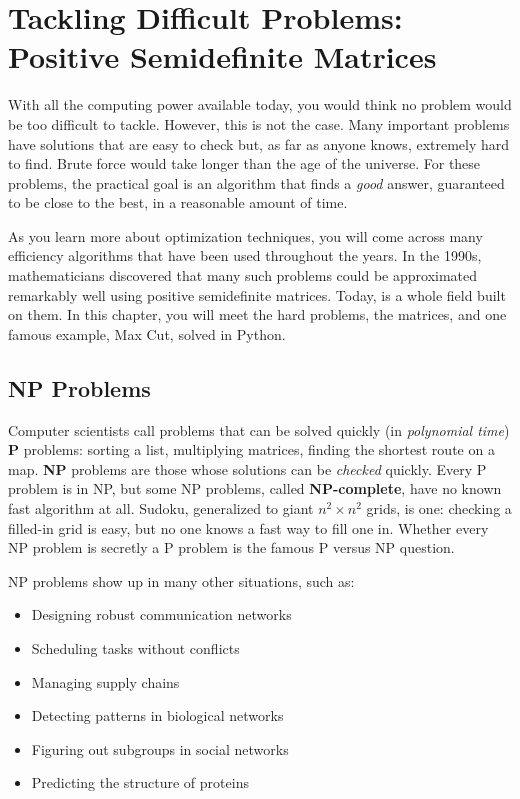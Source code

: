 \chapter{Tackling Difficult Problems: Positive Semidefinite Matrices}

With all the computing power available today, you would think no problem would be too difficult to tackle. However, this is not the case. Many important problems have solutions that are easy to check but, as far
as anyone knows, extremely hard to find. Brute force would take longer
than the age of the universe. For these problems, the practical goal is an
algorithm that finds a \emph{good} answer, guaranteed to be close to the
best, in a reasonable amount of time. 

As you learn more about optimization techniques, you will come across many efficiency algorithms that have been used throughout the years. In the 1990s, mathematicians discovered that many such problems could be
approximated remarkably well using positive semidefinite matrices. Today,
 is a
whole field built on them. In this chapter, you will meet the hard
problems, the matrices, and one famous example, Max Cut, solved in Python.

\section{NP Problems}

Computer scientists call problems that can be solved quickly (in
\emph{polynomial time}) \textbf{P} problems: sorting a list, multiplying
matrices, finding the shortest route on a map. \textbf{NP} problems are
those whose solutions can be \emph{checked} quickly. Every P problem is in
NP, but some NP problems, called \textbf{NP-complete}, have no known fast
algorithm at all. Sudoku, generalized to giant $n^2 \times n^2$ grids, is
one: checking a filled-in grid is easy, but no one knows a fast way to
fill one in. Whether every NP problem is secretly a P problem is the
famous P versus NP question. 

NP problems show up in many other situations, such as:
\begin{itemize}
\item Designing  robust communication networks
\item Scheduling tasks without conflicts
\item Managing supply chains
\item Detecting patterns in biological networks
\item Figuring out subgroups in social networks
\item Predicting the structure of proteins
\end{itemize}

